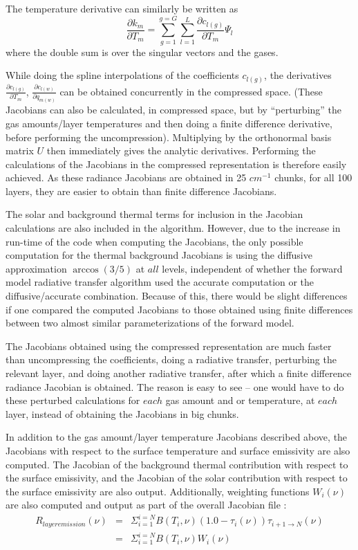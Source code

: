 \documentclass[11pt]{article}
\begin{document}
The temperature derivative can similarly be written as
\begin{equation}
\frac{\partial k_{m}}{\partial T_{m}} = 
\sum_{g=1}^{g=G} \sum_{l=1}^{L} 
\frac{\partial c_{l(g)}}{\partial T_{m}} \Psi_{l}
\end{equation}
where the double sum is over the singular vectors and the gases.

While doing the spline interpolations of the coefficients $c_{l(g)}$,
the derivatives $\frac{\partial c_{l(g)}}{\partial T_{m}}$,
$\frac{\partial c_{l(w)}}{\partial q_{m(w)}}$ can be obtained
concurrently \cite{wil:89} in the compressed space.  (These
Jacobians can also be calculated, in compressed space, but by
``perturbing'' the gas amounts/layer temperatures and then doing a
finite difference derivative, before performing the uncompression).
Multiplying by the orthonormal basis matrix $U$ then immediately gives
the analytic derivatives.  Performing the calculations of the
Jacobians in the compressed representation is therefore easily
achieved. As these radiance Jacobians are obtained in 25 $cm^{-1}$
chunks, for all 100 layers, they are easier to obtain than finite
difference Jacobians.  

The solar and background thermal terms for inclusion in the Jacobian
calculations are also included in the algorithm. However, due to the
increase in run-time of the code when computing the Jacobians, the
only possible computation for the thermal background Jacobians is
using the diffusive approximation $\arccos(3/5)$ at $all$ levels,
independent of whether the forward model radiative transfer algorithm
used the accurate computation or the diffusive/accurate combination.
Because of this, there would be slight differences if one compared the
computed Jacobians to those obtained using finite differences between
two almost similar parameterizations of the forward model.

The Jacobians obtained using the compressed representation are much
faster than uncompressing the coefficients, doing a radiative
transfer, perturbing the relevant layer, and doing another radiative
transfer, after which a finite difference radiance Jacobian is
obtained. The reason is easy to see -- one would have to do these
perturbed calculations for $each$ gas amount and or temperature, 
at $each$ layer, instead of obtaining the Jacobians in big chunks.

In addition to the gas amount/layer temperature Jacobians described
above, the Jacobians with respect to the surface temperature and
surface emissivity are also computed. The Jacobian of the background
thermal contribution with respect to the surface emissivity, and the
Jacobian of the solar contribution with respect to the surface
emissivity are also output.  Additionally, weighting functions
$W_{i}(\nu)$ are also computed and output as part of the overall
Jacobian file :
\begin{eqnarray*}
R_{layer emission} (\nu) &  = &
\Sigma_{i=1}^{i=N} B(T_{i},\nu) (1.0 - \tau_{i}(\nu)) 
\tau_{i+1\rightarrow N}(\nu) \\
& = &\Sigma_{i=1}^{i=N} B(T_{i},\nu) W_{i}(\nu)
\end{eqnarray*}
\end{document}
